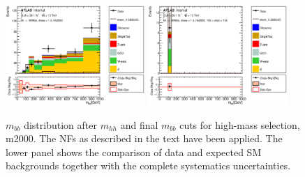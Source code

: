 \begin{figure}
\begin{center}
\includegraphics*[width=0.47\textwidth] {figures/Unblinded_mbb/C_reOpt2000_bbpt350_wwpt250_drww15_hh2000_bbMass_regionA_met25d020.eps}
\includegraphics*[width=0.47\textwidth] {figures/Unblinded_mbb/C_reOpt2000_bbpt350_wwpt250_drww15_hh2000_mbb_bbMass_regionA_met25d020.eps}
\caption[$m_{bb}$ distribution after $m_{hh}$ and final $m_{bb}$ cuts for high-mass selection, m2000.]{$m_{bb}$ distribution after $m_{hh}$ and final $m_{bb}$ cuts for high-mass selection, m2000. The NFs as described in the text have been applied. The lower panel shows the comparison of data and expected SM backgrounds together with the complete systematics uncertainties.}
\end{center}
\end{figure}

